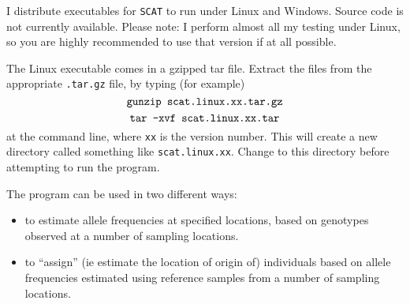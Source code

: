 \documentclass[11pt,titlepage,times,letterpaper]{article}
\def\SCAT{{\tt SCAT} }
\begin{document}
I distribute executables for \SCAT to run under Linux and
Windows. Source code is not currently available. Please note: I
perform almost all my testing under Linux, so you are highly
recommended to use that version if at all possible.

The Linux executable comes in a gzipped tar file.
Extract the files from the appropriate {\tt .tar.gz} file, by typing
(for example)
$$\text{{\tt gunzip scat.linux.xx.tar.gz}}$$
$$\text{{\tt tar -xvf scat.linux.xx.tar}}$$
at the command line, where {\tt xx} is the version number.
This will create a new directory called something like
{\tt scat.linux.xx}. Change to this directory before
attempting to run the program.

%
%

%

The program can be used in two different ways:
\begin{itemize}
\item to estimate allele frequencies at specified
locations, based on genotypes observed at a number of sampling
locations.
\item to ``assign'' (ie estimate the location of origin of)
individuals based on allele
frequencies estimated using reference samples from a number of
sampling locations.
\end{itemize}
\end{document}
